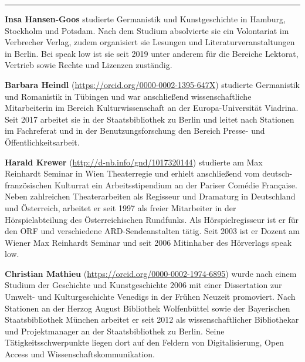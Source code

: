 \begin{center}\rule{0.5\linewidth}{0.5pt}\end{center}

\textbf{Insa Hansen-Goos} studierte Germanistik und Kunstgeschichte in
Hamburg, Stockholm und Potsdam. Nach dem Studium absolvierte sie ein
Volontariat im Verbrecher Verlag, zudem organisiert sie Lesungen und
Literaturveranstaltungen in Berlin. Bei speak low ist sie seit 2019
unter anderem für die Bereiche Lektorat, Vertrieb sowie Rechte und
Lizenzen zuständig.

\textbf{Barbara Heindl} (\url{https://orcid.org/0000-0002-1395-647X})
studierte Germanistik und Romanistik in Tübingen und war anschließend
wissenschaftliche Mitarbeiterin im Bereich Kulturwissenschaft an der
Europa-Universität Viadrina. Seit 2017 arbeitet sie in der
Staatsbibliothek zu Berlin und leitet nach Stationen im Fachreferat und
in der Benutzungsforschung den Bereich Presse- und
Öffentlichkeitsarbeit.

\textbf{Harald Krewer} (\url{http://d-nb.info/gnd/1017320144}) studierte
am Max Reinhardt Seminar in Wien Theaterregie und erhielt anschließend
vom deutsch-französischen Kulturrat ein Arbeitsstipendium an der Pariser
Comédie Française. Neben zahlreichen Theaterarbeiten als Regisseur und
Dramaturg in Deutschland und Österreich, arbeitet er seit 1997 als
freier Mitarbeiter in der Hörspielabteilung des Österreichischen
Rundfunks. Als Hörspielregisseur ist er für den ORF und verschiedene
ARD-Sendeanstalten tätig. Seit 2003 ist er Dozent am Wiener Max
Reinhardt Seminar und seit 2006 Mitinhaber des Hörverlags speak low.

\textbf{Christian Mathieu} (\url{https://orcid.org/0000-0002-1974-6895})
wurde nach einem Studium der Geschichte und Kunstgeschichte 2006 mit
einer Dissertation zur Umwelt- und Kulturgeschichte Venedigs in der
Frühen Neuzeit promoviert. Nach Stationen an der Herzog August
Bibliothek Wolfenbüttel sowie der Bayerischen Staatsbibliothek München
arbeitet er seit 2012 als wissenschaftlicher Bibliothekar und
Projektmanager an der Staatsbibliothek zu Berlin. Seine
Tätigkeitsschwerpunkte liegen dort auf den Feldern von Digitalisierung,
Open Access und Wissenschaftskommunikation.
